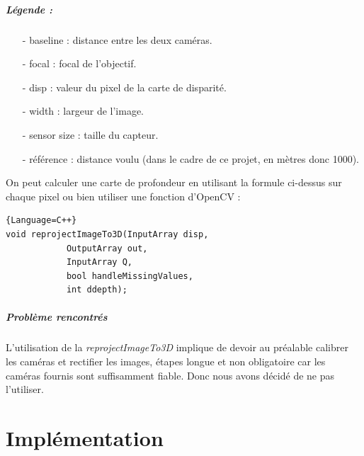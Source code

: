 \documentclass[12pt,a4paper]{report}
\begin{document}
\paragraph{Légende : }
\begin{small}
\begin{enumerate}
\item[-] baseline : distance entre les deux caméras.\\
\item[-] focal : focal de l'objectif.\\
\item[-] disp : valeur du pixel de la carte de disparité.\\
\item[-] width : largeur de l'image.\\
\item[-] sensor size : taille du capteur.\\
\item[-] référence : distance voulu (dans le cadre de ce projet, en mètres donc 1000).\\
\end{enumerate}
\end{small}

On peut calculer une carte de profondeur en utilisant la formule ci-dessus sur chaque pixel ou bien utiliser une fonction d'OpenCV :  

\begin{lstlisting}{Language=C++}
void reprojectImageTo3D(InputArray disp, 
			OutputArray out, 
			InputArray Q, 
			bool handleMissingValues, 
			int ddepth);
\end{lstlisting}

\paragraph{Problème rencontrés}
L'utilisation de la \textit{reprojectImageTo3D} implique de devoir au préalable calibrer les caméras et rectifier les images, étapes longue et non obligatoire car les caméras fournis sont suffisamment fiable. Donc nous avons décidé de ne pas l'utiliser.

\chapter{Implémentation}
\end{document}
